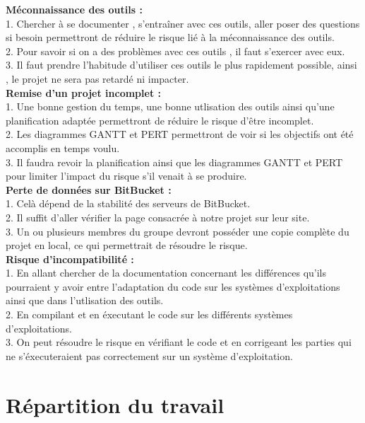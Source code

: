 \documentclass[]{article}
\begin{document}
\textbf{Méconnaissance des outils :}\\
1.  Chercher à se documenter , s'entraîner avec ces outils, aller poser des questions si besoin permettront de réduire le risque lié à la 
méconnaissance des outils.\\
2.  Pour savoir si on a des problèmes avec ces outils , il faut s'exercer avec eux.\\
3.  Il faut prendre l'habitude d'utiliser ces outils le plus rapidement possible, ainsi , le projet ne sera pas retardé ni impacter.\\

\textbf{Remise d'un projet incomplet :}\\
1.  Une bonne gestion du temps, une bonne utlisation des outils ainsi qu'une planification adaptée permettront de réduire le risque d'être incomplet.\\
2.  Les diagrammes GANTT et PERT permettront de voir si les objectifs ont été accomplis en temps voulu.\\
3.  Il faudra revoir la planification ainsi que les diagrammes GANTT et PERT pour limiter l'impact du risque s'il venait à se produire.\\

\textbf{Perte de données sur BitBucket :}\\
1. Celà dépend de la stabilité des serveurs de BitBucket.\\
2. Il suffit d'aller vérifier la page consacrée à notre projet sur leur site.\\
3. Un ou plusieurs membres du groupe devront posséder une copie complète du projet en local, ce qui permettrait 
de résoudre le risque.\\

\textbf{Risque d'incompatibilité :}\\
1. En allant chercher de la documentation concernant les différences qu'ils pourraient y avoir entre l'adaptation du code sur les systèmes d'exploitations
ainsi que dans l'utlisation des outils.\\
2. En compilant et en éxecutant le code sur les différents systèmes d'exploitations.\\
3. On peut résoudre le risque en vérifiant le code et en corrigeant les parties qui ne s'éxecuteraient pas correctement sur un système d'exploitation.

\newpage
\section{Répartition du travail}
\end{document}
